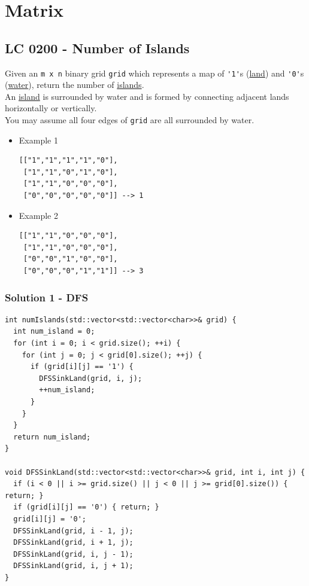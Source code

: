 \chapter{Matrix}
\section{LC 0200 - Number of Islands}
Given an {\colorbox{CodeBackground}{\lstinline|m x n|}} binary grid {\colorbox{CodeBackground}{\lstinline|grid|}} which represents a map of {\colorbox{CodeBackground}{\lstinline|'1'|}}s (\ul{land}) and {\colorbox{CodeBackground}{\lstinline|'0'|}}s (\ul{water}), return the number of \ul{islands}.\\

An \ul{island} is surrounded by water and is formed by connecting adjacent lands horizontally or vertically. \\

You may assume all four edges of {\colorbox{CodeBackground}{\lstinline|grid|}} are all surrounded by water.\\

\begin{itemize}
\item Example 1
\begin{lstlisting}
[["1","1","1","1","0"],
 ["1","1","0","1","0"],
 ["1","1","0","0","0"],
 ["0","0","0","0","0"]] --> 1
\end{lstlisting}
\item Example 2
\begin{lstlisting}
[["1","1","0","0","0"],
 ["1","1","0","0","0"],
 ["0","0","1","0","0"],
 ["0","0","0","1","1"]] --> 3
\end{lstlisting}
\end{itemize}

\subsection*{Solution 1 - DFS}
\begin{lstlisting}
int numIslands(std::vector<std::vector<char>>& grid) {
  int num_island = 0;
  for (int i = 0; i < grid.size(); ++i) {
    for (int j = 0; j < grid[0].size(); ++j) {
      if (grid[i][j] == '1') {
        DFSSinkLand(grid, i, j);
        ++num_island;
      }
    }
  }
  return num_island;
}

void DFSSinkLand(std::vector<std::vector<char>>& grid, int i, int j) {
  if (i < 0 || i >= grid.size() || j < 0 || j >= grid[0].size()) { return; }
  if (grid[i][j] == '0') { return; }
  grid[i][j] = '0';
  DFSSinkLand(grid, i - 1, j);
  DFSSinkLand(grid, i + 1, j);
  DFSSinkLand(grid, i, j - 1);
  DFSSinkLand(grid, i, j + 1);
}
\end{lstlisting}

